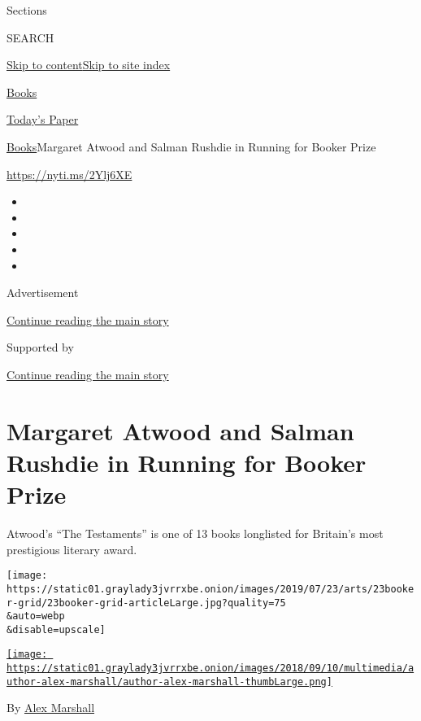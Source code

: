 Sections

SEARCH

\protect\hyperlink{site-content}{Skip to
content}\protect\hyperlink{site-index}{Skip to site index}

\href{https://www.nytimes3xbfgragh.onion/section/books}{Books}

\href{https://myaccount.nytimes3xbfgragh.onion/auth/login?response_type=cookie\&client_id=vi}{}

\href{https://www.nytimes3xbfgragh.onion/section/todayspaper}{Today's
Paper}

\href{/section/books}{Books}\textbar{}Margaret Atwood and Salman Rushdie
in Running for Booker Prize

\url{https://nyti.ms/2Ylj6XE}

\begin{itemize}
\item
\item
\item
\item
\item
\end{itemize}

Advertisement

\protect\hyperlink{after-top}{Continue reading the main story}

Supported by

\protect\hyperlink{after-sponsor}{Continue reading the main story}

\hypertarget{margaret-atwood-and-salman-rushdie-in-running-for-booker-prize}{%
\section{Margaret Atwood and Salman Rushdie in Running for Booker
Prize}\label{margaret-atwood-and-salman-rushdie-in-running-for-booker-prize}}

Atwood's ``The Testaments'' is one of 13 books longlisted for Britain's
most prestigious literary award.

\texttt{[image: https://static01.graylady3jvrrxbe.onion/images/2019/07/23/arts/23booker-grid/23booker-grid-articleLarge.jpg?quality=75\\\&auto=webp\\\&disable=upscale]}

\href{https://www.nytimes3xbfgragh.onion/by/alex-marshall}{\texttt{[image: https://static01.graylady3jvrrxbe.onion/images/2018/09/10/multimedia/author-alex-marshall/author-alex-marshall-thumbLarge.png]}}

By \href{https://www.nytimes3xbfgragh.onion/by/alex-marshall}{Alex
Marshall}


